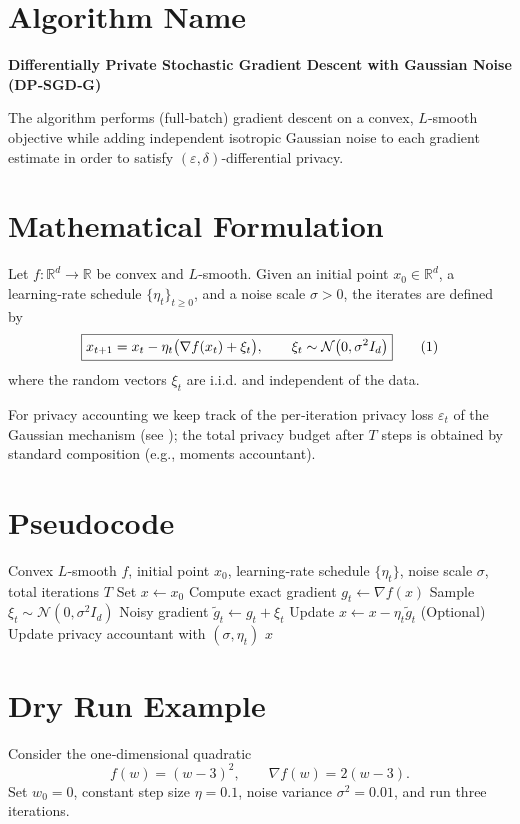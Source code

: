 \documentclass{article}
\newcommand{\RR}{\mathbb{R}}
\begin{document}
\section*{Algorithm Name}
\textbf{Differentially Private Stochastic Gradient Descent with Gaussian Noise (DP‑SGD‑G)}  

The algorithm performs (full‑batch) gradient descent on a convex, $L$‑smooth objective while adding independent isotropic Gaussian noise to each gradient estimate in order to satisfy $(\varepsilon,\delta)$‑differential privacy.

\section*{Mathematical Formulation}
Let $f:\RR^{d}\to\RR$ be convex and $L$‑smooth.  
Given an initial point $x_{0}\in\RR^{d}$, a learning‑rate schedule $\{\eta_{t}\}_{t\ge 0}$, and a noise scale $\sigma>0$, the iterates are defined by  
\[
\boxed{%
x_{t+1}=x_{t}-\eta_{t}\bigl(\nabla f(x_{t})+\xi_{t}\bigr),\qquad 
\xi_{t}\sim\mathcal{N}\bigl(0,\sigma^{2}I_{d}\bigr)
}\tag{1}
\]
where the random vectors $\xi_{t}$ are i.i.d. and independent of the data.  

For privacy accounting we keep track of the per‑iteration privacy loss $\varepsilon_{t}$ of the Gaussian mechanism (see \cite{dwork2014algorithmic}); the total privacy budget after $T$ steps is obtained by standard composition (e.g., moments accountant).  

\section*{Pseudocode}
\begin{algorithm}[H]
\caption{DP‑SGD‑G}
\begin{algorithmic}[1]
\REQUIRE Convex $L$‑smooth $f$, initial point $x_{0}$, learning‑rate schedule $\{\eta_{t}\}$, noise scale $\sigma$, total iterations $T$
\STATE Set $x\gets x_{0}$
    \STATE Compute exact gradient $g_{t}\gets \nabla f(x)$
    \STATE Sample $\xi_{t}\sim\mathcal{N}(0,\sigma^{2}I_{d})$
    \STATE Noisy gradient $\tilde g_{t}\gets g_{t}+\xi_{t}$
    \STATE Update $x\gets x-\eta_{t}\tilde g_{t}$
    \STATE (Optional) Update privacy accountant with $(\sigma,\eta_{t})$
\ENDFOR
\RETURN $x$
\end{algorithmic}
\end{algorithm}

\section*{Dry Run Example}
Consider the one‑dimensional quadratic
\[
f(w)=(w-3)^{2},\qquad \nabla f(w)=2(w-3).
\]
Set $w_{0}=0$, constant step size $\eta=0.1$, noise variance $\sigma^{2}=0.01$, and run three iterations.
\end{document}
